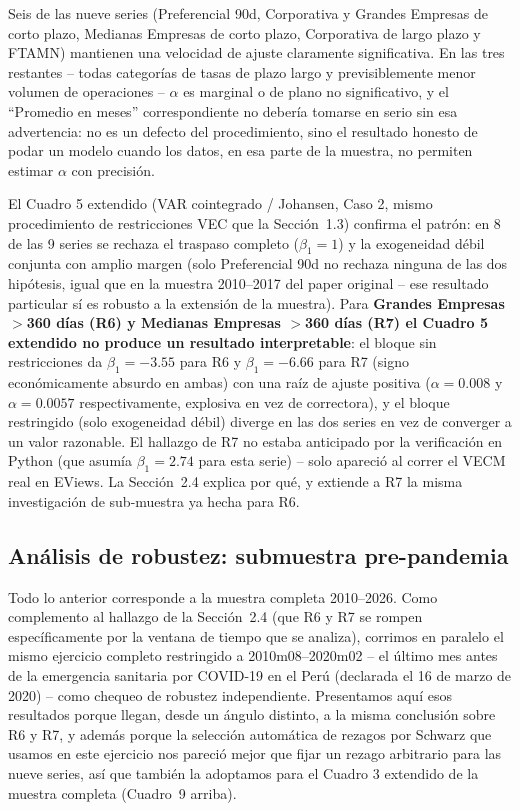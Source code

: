 \documentclass[12pt, letterpaper]{article}
\begin{document}
Seis de las nueve series (Preferencial 90d, Corporativa y Grandes
Empresas de corto plazo, Medianas Empresas de corto plazo, Corporativa
de largo plazo y FTAMN) mantienen una velocidad de ajuste claramente
significativa. En las tres restantes -- todas categorías de tasas de
plazo largo y previsiblemente menor volumen de operaciones --
$\alpha$ es marginal o de plano no significativo, y el ``Promedio en
meses'' correspondiente no debería tomarse en serio sin esa
advertencia: no es un defecto del procedimiento, sino el resultado
honesto de podar un modelo cuando los datos, en esa parte de la
muestra, no permiten estimar $\alpha$ con precisión.

El Cuadro 5 extendido (VAR cointegrado / Johansen, Caso 2, mismo
procedimiento de restricciones VEC que la Sección~1.3) confirma el
patrón: en 8 de las 9 series se rechaza el traspaso completo
($\beta_1=1$) y la exogeneidad débil conjunta con amplio margen
(solo Preferencial 90d no rechaza ninguna de las dos hipótesis, igual
que en la muestra 2010--2017 del paper original -- ese resultado
particular sí es robusto a la extensión de la muestra). Para
\textbf{Grandes Empresas $>$360 días (R6) y Medianas Empresas $>$360
días (R7) el Cuadro 5 extendido no produce un resultado
interpretable}: el bloque sin restricciones da $\beta_1=-3.55$ para R6
y $\beta_1=-6.66$ para R7 (signo económicamente absurdo en ambas) con
una raíz de ajuste positiva ($\alpha=0.008$ y $\alpha=0.0057$
respectivamente, explosiva en vez de correctora), y el bloque
restringido (solo exogeneidad débil) diverge en las dos series en vez
de converger a un valor razonable. El hallazgo de R7 no estaba
anticipado por la verificación en Python (que asumía $\beta_1=2.74$
para esta serie) -- solo apareció al correr el VECM real en EViews. La
Sección~2.4 explica por qué, y extiende a R7 la misma investigación de
sub-muestra ya hecha para R6.

\subsection{Análisis de robustez: submuestra pre-pandemia}

Todo lo anterior corresponde a la muestra completa 2010--2026. Como
complemento al hallazgo de la Sección~2.4 (que R6 y R7 se rompen
específicamente por la ventana de tiempo que se analiza), corrimos en
paralelo el mismo ejercicio completo restringido a 2010m08--2020m02 --
el último mes antes de la emergencia sanitaria por COVID-19 en el Perú
(declarada el 16 de marzo de 2020) -- como chequeo de robustez
independiente. Presentamos aquí esos resultados porque llegan, desde
un ángulo distinto, a la misma conclusión sobre R6 y R7, y además
porque la selección automática de rezagos por Schwarz que usamos en
este ejercicio nos pareció mejor que fijar un rezago arbitrario para
las nueve series, así que también la adoptamos para el Cuadro 3
extendido de la muestra completa (Cuadro~9 arriba).
\end{document}
